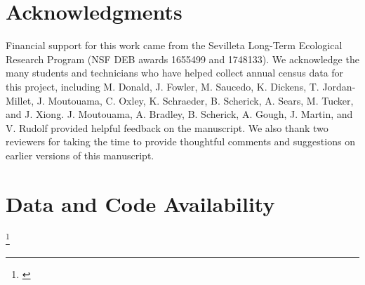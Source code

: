\documentclass[11pt]{article}
\newcommand{\tom}[2]{{\color{red}{#1}}\footnote{\textit{\color{red}{#2}}}}
\begin{document}
\section*{Acknowledgments}
Financial support for this work came from the Sevilleta Long-Term Ecological Research Program (NSF DEB awards 1655499 and 1748133).
We acknowledge the many students and technicians who have helped collect annual census data for this project, including M. Donald, J. Fowler, M. Saucedo, K. Dickens, T. Jordan-Millet, J. Moutouama, C. Oxley, K. Schraeder, B. Scherick, A. Sears, M. Tucker, and J. Xiong. 
J. Moutouama, A. Bradley, B. Scherick, A. Gough, J. Martin, and V. Rudolf provided helpful feedback on the manuscript. 
We also thank two reviewers for taking the time to provide thoughtful comments and suggestions on earlier versions of this manuscript.



\section*{Data and Code Availability}
\tom{This section will be filled out once double blind reviews are complete. }{Be sure to update this with the new data package.}


\renewcommand{\theequation}{A\arabic{equation}}
\renewcommand{\thetable}{A\arabic{table}}
\setcounter{equation}{0}  %
\setcounter{figure}{0}
\setcounter{table}{0}

%
%


\end{document}
